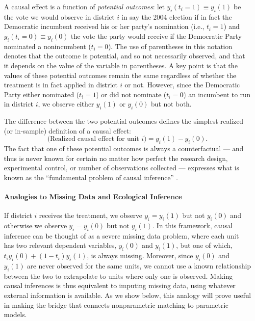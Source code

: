 \documentclass[11pt,titlepage]{article}
\begin{document}
A causal effect is a function of \emph{potential outcomes}: let
$y_i(t_i=1)\equiv y_i(1)$ be the vote we would observe in district $i$
in say the 2004 election if in fact the Democratic incumbent received
his or her party's nomination (i.e., $t_i=1$) and $y_i(t_i=0)\equiv
y_i(0)$ the vote the party would receive if the Democratic Party
nominated a nonincumbent ($t_i=0$).  The use of parentheses in this
notation denotes that the outcome is potential, and so not necessarily
observed, and that it depends on the value of the variable in
parentheses.  A key point is that the values of these potential
outcomes remain the same regardless of whether the treatment is in
fact applied in district $i$ or not.  However, since the Democratic
Party either nominated ($t_i=1$) or did not nominate ($t_i=0$) an
incumbent to run in district $i$, we observe either $y_{i}(1)$ or
$y_{i}(0)$ but not both.

The difference between the two potential outcomes defines the simplest
realized (or in-sample) definition of a causal effect:
\begin{equation}
  \label{rce}
  \text{(Realized causal effect for unit $i$)} = y_i(1) - y_i(0).
\end{equation}
The fact that one of these potential outcomes is always a
counterfactual --- and thus is never known for certain no matter how
perfect the research design, experimental control, or number of
observations collected --- expresses what is known as the
``fundamental problem of causal inference'' \citep{Holland86}.

\paragraph{Analogies to Missing Data and Ecological Inference}
If district $i$ receives the treatment, we observe $y_i=y_i(1)$ but
not $y_i(0)$ and otherwise we observe $y_i=y_i(0)$ but not $y_i(1)$.
In this framework, causal inference can be thought of as a severe
missing data problem, where each unit has two relevant dependent
variables, $y_i(0)$ and $y_i(1)$, but one of which, $t_iy_i(0) +
(1-t_i)y_i(1)$, is always missing.  Moreover, since $y_i(0)$ and
$y_i(1)$ are never observed for the same units, we cannot use a known
relationship between the two to extrapolate to units where only one is
observed.  Making causal inferences is thus equivalent to imputing
missing data, using whatever external information is available.  As we
show below, this analogy will prove useful in making the bridge that
connects nonparametric matching to parametric models.
\end{document}

